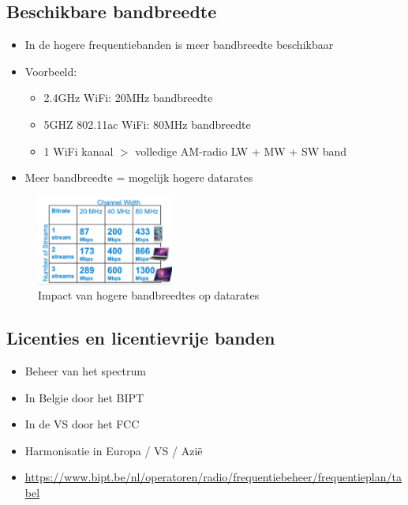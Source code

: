 \documentclass{article}
\begin{document}
\subsection{Beschikbare bandbreedte}
\begin{itemize}
    \item In de hogere frequentiebanden is meer bandbreedte beschikbaar
    \item Voorbeeld:
    \begin{itemize}
        \item 2.4GHz WiFi: 20MHz bandbreedte
        \item 5GHZ 802.11ac WiFi: 80MHz bandbreedte
        \item 1 WiFi kanaal $>$ volledige AM-radio LW + MW + SW band
    \end{itemize}
    \item Meer bandbreedte = mogelijk hogere datarates
\end{itemize}

\begin{figure}[H]
    \centering
    \includegraphics[width=0.4\textwidth]{Screenshot_20200315_160828.png}
    \caption{Impact van hogere bandbreedtes op datarates}
\end{figure}

\subsection{Licenties en licentievrije banden}
\begin{itemize}
    \item Beheer van het spectrum 
    \item In Belgie door het BIPT
    \item In de VS door het FCC
    \item Harmonisatie in Europa / VS / Azië
    \item \url{https://www.bipt.be/nl/operatoren/radio/frequentiebeheer/frequentieplan/tabel}
\end{itemize}
\end{document}
